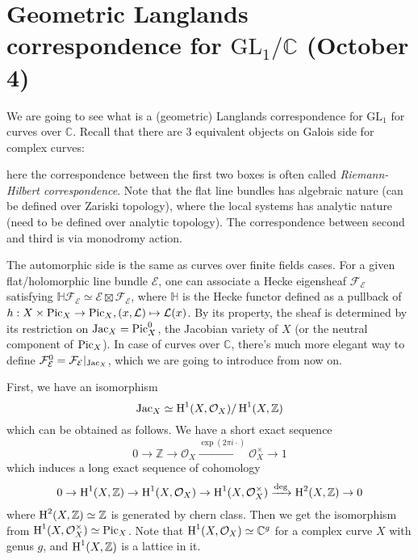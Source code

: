 \newpage
\section{Geometric Langlands correspondence for $\mathrm{GL}_{1}/\mathbb{C}$ (October 4)}

We are going to see what is a (geometric) Langlands correspondence for $\mathrm{GL}_1$ for
curves over $\mathbb{C}$.
Recall that there are 3 equivalent objects on Galois side for complex curves:

\begin{center}
\end{center}
here the correspondence between the first two boxes is often called \emph{Riemann-Hilbert correspondence}.
Note that the flat line bundles has algebraic nature (can be defined over Zariski topology), where
the local systems has analytic nature (need to be defined over analytic topology).
The correspondence between second and third is via monodromy action.

The automorphic side is the same as curves over finite fields cases.
For a given flat/holomorphic line bundle $\mathcal{E}$, one can associate a Hecke eigensheaf
$\mathcal{F}_{\mathcal{E}}$ satisfying $\mathbb{H}\mathcal{F}_{\mathcal{E}} \simeq \mathcal{E} \boxtimes \mathcal{F}_{\mathcal{E}}$,
where $\mathbb{H}$ is the Hecke functor defined as a pullback of $h: X \times \operatorname{\mathrm{Pic}}_X \to \operatorname{\mathrm{Pic}}_X, (x, \mathcal{L}) \mapsto \mathcal{L}(x)$.
By its property, the sheaf is determined by its restriction on $\operatorname{\mathrm{Jac}}_X = \operatorname{\mathrm{Pic}}_X^0$, the Jacobian variety of $X$
(or the neutral component of $\operatorname{\mathrm{Pic}}_X$).
In case of curves over $\mathbb{C}$, there's much more elegant way to define $\mathcal{F}_{\mathcal{E}}^{0} = \mathcal{F}_{\mathcal{E}} |_{\operatorname{\mathrm{Jac}}_X}$,
which we are going to introduce from now on.

First, we have an isomorphism
$$
\operatorname{\mathrm{Jac}}_X \simeq \operatorname{\mathrm{H}}^{1}(X, \mathcal{O}_X) / \operatorname{\mathrm{H}}^{1}(X, \mathbb{Z})
$$
which can be obtained as follows.
We have a short exact sequence
$$
0 \to \mathbb{Z} \to \mathcal{O}_X \xrightarrow{\exp(2\pi i\cdot)} \mathcal{O}_X^{\times} \to 1
$$
which induces a long exact sequence of cohomology
$$
0 \to \operatorname{\mathrm{H}}^{1}(X, \mathbb{Z}) \to \operatorname{\mathrm{H}}^1(X, \mathcal{O}_X) \to \operatorname{\mathrm{H}}^{1}(X, \mathcal{O}_X^{\times}) \xrightarrow{\mathrm{deg}} \operatorname{\mathrm{H}}^{2}(X, \mathbb{Z}) \to 0
$$
where $\operatorname{\mathrm{H}}^{2}(X, \mathbb{Z}) \simeq \mathbb{Z}$ is generated by chern class.
Then we get the isomorphism from $\operatorname{\mathrm{H}}^{1}(X, \mathcal{O}_X^{\times}) \simeq \operatorname{\mathrm{Pic}}_X$.
Note that $\operatorname{\mathrm{H}}^{1}(X, \mathcal{O}_X) \simeq \mathbb{C}^{g}$ for a complex curve $X$ with genus $g$,
and $\operatorname{\mathrm{H}}^{1}(X, \mathbb{Z})$ is a lattice in it.

